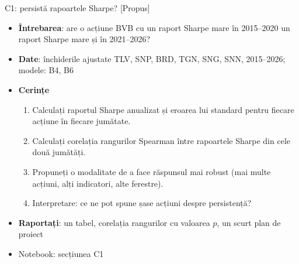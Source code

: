 \begin{frame}{C1: persistă rapoartele Sharpe? [Propus]}
\itemsize{\footnotesize}
\begin{itemize}
\item \textbf{Întrebarea}: are o acțiune BVB cu un raport Sharpe mare în 2015--2020 un raport Sharpe mare și în 2021--2026?
\item \textbf{Date}: închiderile ajustate TLV, SNP, BRD, TGN, SNG, SNN, 2015--2026; modele: B4, B6
\item \textbf{Cerințe}
\begin{enumerate}
    \item Calculați raportul Sharpe anualizat și eroarea lui standard pentru fiecare acțiune în fiecare jumătate.
    \item Calculați corelația rangurilor Spearman între rapoartele Sharpe din cele două jumătăți.
    \item Propuneți o modalitate de a face răspunsul mai robust (mai multe acțiuni, alți indicatori, alte ferestre).
    \item Interpretare: ce ne pot spune șase acțiuni despre persistență?
\end{enumerate}
\item \textbf{Raportați}: un tabel, corelația rangurilor cu valoarea $p$, un scurt plan de proiect
\item Notebook: secțiunea C1
\end{itemize}
\end{frame}

